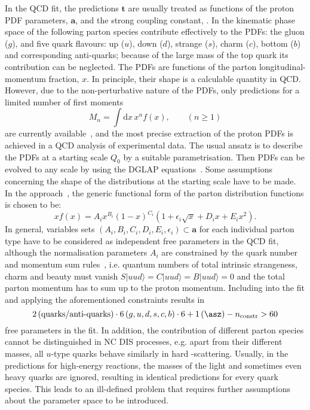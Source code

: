 In the QCD fit, the predictions $\mathbf{t}$ are usually treated as functions of the proton PDF parameters, $\mathbf{a}$, and the strong coupling constant, \asz. In the kinematic phase space of \hera the following parton species contribute effectively to the PDFs: the gluon ($g$), and five quark flavours: up ($u$), down ($d$), strange ($s$), charm ($c$), bottom ($b$) and corresponding anti-quarks; because of the large mass of the top quark its contribution can be neglected. The PDFs are functions of the parton longitudinal-momentum fraction, $x$. In principle, their shape is a calculable quantity in QCD. However, due to the non-perturbative nature of the PDFs, only predictions for a limited number of first moments 
\begin{equation}
 M_n=\int\mathrm{d}x\,x^n f\left(x\right), \qquad (n\ge1)
\end{equation}
are currently available~\cite{Hagler:2009ni}, and the most precise extraction of the proton PDFs is achieved in a QCD analysis of experimental data. The usual ansatz is to describe the PDFs at a starting scale $Q_0$ by a suitable parametrisation. Then PDFs can be evolved to any scale by using the DGLAP equations~\cite{Altarelli:1977zs,Gribov:1972,Dokshitzer:1977,Balitsky:1978}. Some assumptions concerning the shape of the distributions at the starting scale have to be made. In the \herapdf approach~\cite{Aaron:2009aa}, the generic functional form of the parton distribution functions is chosen to be:
\begin{equation}
 xf\left(x\right) = A_ix^{B_i}\left(1-x\right)^{C_i}\left(1+\epsilon_i\sqrt{x}+D_ix+E_ix^2\right).
 \label{eq:pdfansatz}
\end{equation}
In general, variables sets $\left(A_i,B_i,C_i,D_i,E_i,\epsilon_i\right)\subset\mathbf{a}$ for each individual parton type have to be considered as independent free parameters in the QCD fit, although the normalisation parameters $A_i$ are constrained by the quark number and momentum sum rules~\cite{Yndurain:2006lfa}, i.e. quantum numbers of total intrinsic strangeness, charm and beauty must vanish $S|uud\rangle=C|uud\rangle=B|uud\rangle=0$ and the total parton momentum has to sum up to the proton momentum. Including \asz into the fit and applying the aforementioned constraints results in 
\begin{equation}
2 \left( \text{quarks/anti-quarks}\right)\cdot 6\left(g,u,d,s,c,b\right)\cdot 6 + 1\left(\asz\right) - n_\text{constr} > 60
\end{equation}
free parameters in the fit. In addition, the contribution of different parton species cannot be distinguished in NC DIS processes, e.g. apart from their different masses, all $u$-type quarks behave similarly in hard \ep-scattering. Usually, in the predictions for high-energy reactions, the masses of the light and sometimes even heavy quarks are ignored, resulting in identical predictions for every quark species. This leads to an ill-defined problem that requires further assumptions about the parameter space to be introduced. 

